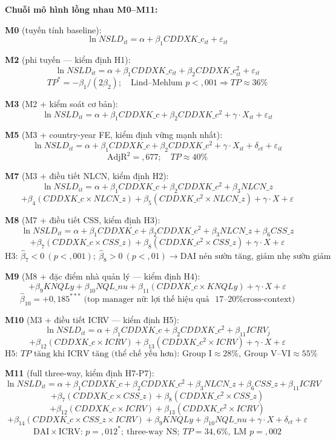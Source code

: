 \documentclass[12pt,a4paper]{article}
\begin{document}
\textbf{Chuỗi mô hình lồng nhau M0--M11:}

\textbf{M0} (tuyến tính baseline):
\[\ln NSLD_{it} = \alpha + \beta_1 CDDXK\_c_{it} + \varepsilon_{it}\]

\textbf{M2} (phi tuyến --- kiểm định H1):
\[\ln NSLD_{it} = \alpha + \beta_1 CDDXK\_c_{it} + \beta_2 CDDXK\_c^2_{it} + \varepsilon_{it}\]
\[TP^* = -\beta_1 / (2\beta_2); \quad \text{Lind–Mehlum } p < {,}001 \Rightarrow TP \approx 36\%\]

\textbf{M3} (M2 + kiểm soát cơ bản):
\[\ln NSLD_{it} = \alpha + \beta_1 CDDXK\_c + \beta_2 CDDXK\_c^2 + \gamma \cdot X_{it} + \varepsilon_{it}\]

\textbf{M5} (M3 + country-year FE, kiểm định vững mạnh nhất):
\[\ln NSLD_{it} = \alpha + \beta_1 CDDXK\_c + \beta_2 CDDXK\_c^2 + \gamma \cdot X_{it} + \delta_{ct} + \varepsilon_{it}\]
\[\text{AdjR}^2 = {,}677; \quad TP \approx 40\%\]

\textbf{M7} (M3 + điều tiết NLCN, kiểm định H2):
\[\ln NSLD_{it} = \alpha + \beta_1 CDDXK\_c + \beta_2 CDDXK\_c^2 + \beta_3 NLCN\_z\]
\[+ \beta_4 (CDDXK\_c \times NLCN\_z) + \beta_5 (CDDXK\_c^2 \times NLCN\_z) + \gamma \cdot X + \varepsilon\]

\textbf{M8} (M7 + điều tiết CSS, kiểm định H3):
\[\ln NSLD_{it} = \alpha + \beta_1 CDDXK\_c + \beta_2 CDDXK\_c^2 + \beta_3 NLCN\_z + \beta_6 CSS\_z\]
\[+ \beta_7 (CDDXK\_c \times CSS\_z) + \beta_8 (CDDXK\_c^2 \times CSS\_z) + \gamma \cdot X + \varepsilon\]
\[\text{H3: } \hat\beta_7 < 0\ (p < {,}001);\ \hat\beta_8 > 0\ (p < {,}01) \rightarrow \text{DAI nén sườn tăng, giảm nhẹ sườn giảm}\]

\textbf{M9} (M8 + đặc điểm nhà quản lý --- kiểm định H4):
\[+ \beta_9 KNQLy + \beta_{10} NQL\_nu + \beta_{11}(CDDXK\_c \times KNQLy) + \gamma \cdot X + \varepsilon\]
\[\hat\beta_{10} = +0{,}185^{***} \text{ (top manager nữ: lợi thế hiệu quả ~17–20\% cross-context)}\]

\textbf{M10} (M3 + điều tiết ICRV --- kiểm định H5):
\[\ln NSLD_{it} = \alpha + \beta_1 CDDXK\_c + \beta_2 CDDXK\_c^2 + \beta_{11} ICRV_j\]
\[+ \beta_{12}(CDDXK\_c \times ICRV) + \beta_{13}(CDDXK\_c^2 \times ICRV) + \gamma \cdot X + \varepsilon\]
\[\text{H5: } TP \text{ tăng khi ICRV tăng (thể chế yếu hơn): Group I} \approx 28\%,\ \text{Group V–VI} \approx 55\%\]

\textbf{M11} (full three-way, kiểm định H7-P7):
\[\ln NSLD_{it} = \alpha + \beta_1 CDDXK\_c + \beta_2 CDDXK\_c^2 + \beta_3 NLCN\_z + \beta_6 CSS\_z + \beta_{11} ICRV\]
\[+ \beta_{7}(CDDXK\_c \times CSS\_z) + \beta_{8}(CDDXK\_c^2 \times CSS\_z)\]
\[+ \beta_{12}(CDDXK\_c \times ICRV) + \beta_{13}(CDDXK\_c^2 \times ICRV)\]
\[+ \beta_{14}(CDDXK\_c \times CSS\_z \times ICRV) + \beta_9 KNQLy + \beta_{10} NQL\_nu + \gamma \cdot X + \delta_{ct} + \varepsilon\]
\[\text{DAI} \times \text{ICRV: } p = {,}012^*;\ \text{three-way NS};\ TP = 34{,}6\%,\ \text{LM } p = {,}002\]
\end{document}
